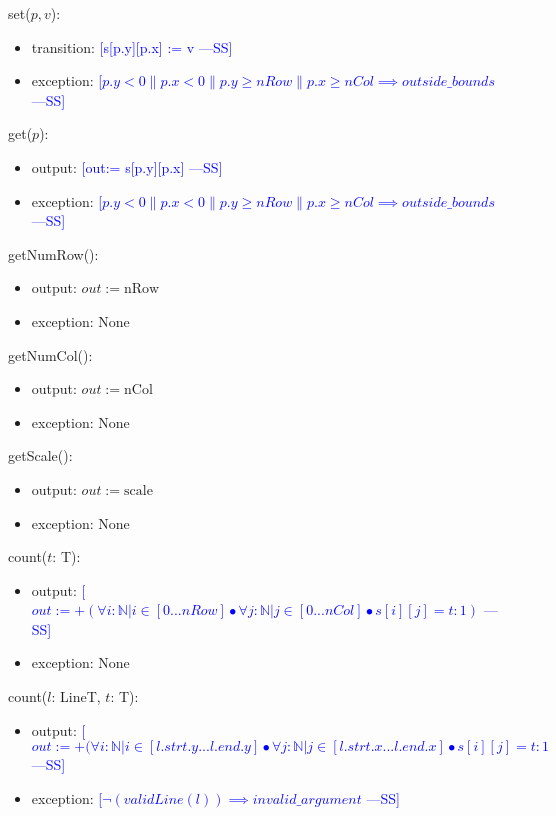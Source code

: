 \documentclass[12pt]{article}
\newcommand{\authornote}[3]{\textcolor{#1}{[#3 ---#2]}}
\newcommand{\authornote}[3]{}
\newcommand{\wss}[1]{\authornote{blue}{SS}{#1}}
\begin{document}
\noindent set($p, v$):
\begin{itemize}
\item transition: \wss{s[p.y][p.x] := v}
\item exception: \wss{$p.y < 0 \| p.x < 0 \| p.y \geq nRow \| p.x \geq nCol \implies outside\_bounds$}
\end{itemize}

\noindent get($p$):
\begin{itemize}
\item output: \wss{out:= s[p.y][p.x]}
\item exception: \wss{$p.y < 0 \| p.x < 0 \| p.y \geq nRow \| p.x \geq nCol \implies outside\_bounds$}
\end{itemize}

\noindent getNumRow():
\begin{itemize}
\item output: $out := \mbox{nRow}$
\item exception: None
\end{itemize}

\noindent getNumCol():
\begin{itemize}
\item output: $out := \mbox{nCol}$
\item exception: None
\end{itemize}

\noindent getScale():
\begin{itemize}
\item output: $out := \mbox{scale}$
\item exception: None
\end{itemize}

\noindent count($t$: T):
\begin{itemize}
\item output: \wss{$out:= +(\forall i : \mathbb{N} | i \in [0...nRow] \bullet \forall j : \mathbb{N} | j \in [0...nCol] \bullet s[i][j] = t : 1)$}
\item exception: None
\end{itemize}

\noindent count($l$: LineT, $t$: T):
\begin{itemize}
\item output: \wss{$out:= +(\forall i : \mathbb{N} | i \in [l.strt.y...l.end.y] \bullet \forall j : \mathbb{N} | j \in [l.strt.x...l.end.x] \bullet s[i][j] = t : 1$}
\item exception: \wss{$\lnot(validLine(l)) \implies invalid\_argument$}
\end{itemize}
\end{document}
